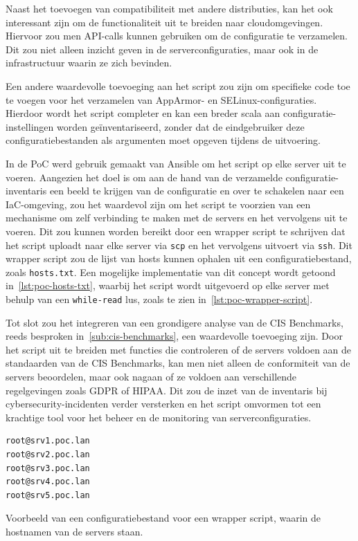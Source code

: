 Naast het toevoegen van compatibiliteit met andere distributies, kan het ook interessant zijn om de functionaliteit uit te breiden naar cloudomgevingen.
Hiervoor zou men API-calls kunnen gebruiken om de configuratie te verzamelen.
Dit zou niet alleen inzicht geven in de serverconfiguraties, maar ook in de infrastructuur waarin ze zich bevinden.

Een andere waardevolle toevoeging aan het script zou zijn om specifieke code toe te voegen voor het verzamelen van AppArmor- en SELinux-configuraties.
Hierdoor wordt het script completer en kan een breder scala aan configuratie-instellingen worden ge\"inventariseerd, zonder dat de eindgebruiker deze configuratiebestanden als argumenten moet opgeven tijdens de uitvoering.

In de PoC werd gebruik gemaakt van Ansible om het script op elke server uit te voeren.
Aangezien het doel is om aan de hand van de verzamelde configuratie-inventaris een beeld te krijgen van de configuratie en over te schakelen naar een IaC-omgeving, zou het waardevol zijn om het script te voorzien van een mechanisme om zelf verbinding te maken met de servers en het vervolgens uit te voeren.
Dit zou kunnen worden bereikt door een wrapper script te schrijven dat het script uploadt naar elke server via \texttt{scp} en het vervolgens uitvoert via \texttt{ssh}.
Dit wrapper script zou de lijst van hosts kunnen ophalen uit een configuratiebestand, zoals \texttt{hosts.txt}.
Een mogelijke implementatie van dit concept wordt getoond in~\ref{lst:poc-hosts-txt}, waarbij het script wordt uitgevoerd op elke server met behulp van een \texttt{while-read} lus, zoals te zien in~\ref{lst:poc-wrapper-script}.

Tot slot zou het integreren van een grondigere analyse van de CIS Benchmarks, reeds besproken in~\ref{sub:cis-benchmarks}, een waardevolle toevoeging zijn.
Door het script uit te breiden met functies die controleren of de servers voldoen aan de standaarden van de CIS Benchmarks, kan men niet alleen de conformiteit van de servers beoordelen, maar ook nagaan of ze voldoen aan verschillende regelgevingen zoals GDPR of HIPAA.
Dit zou de inzet van de inventaris bij cybersecurity-incidenten verder versterken en het script omvormen tot een krachtige tool voor het beheer en de monitoring van serverconfiguraties.

\begin{listing}
  \begin{verbatim}
root@srv1.poc.lan
root@srv2.poc.lan
root@srv3.poc.lan
root@srv4.poc.lan
root@srv5.poc.lan
  \end{verbatim}
  \caption[Mogelijk configuratiebestand voor wrapper script.]{Voorbeeld van een configuratiebestand voor een wrapper script, waarin de hostnamen van de servers staan.}
  \label{lst:poc-hosts-txt}
\end{listing}

